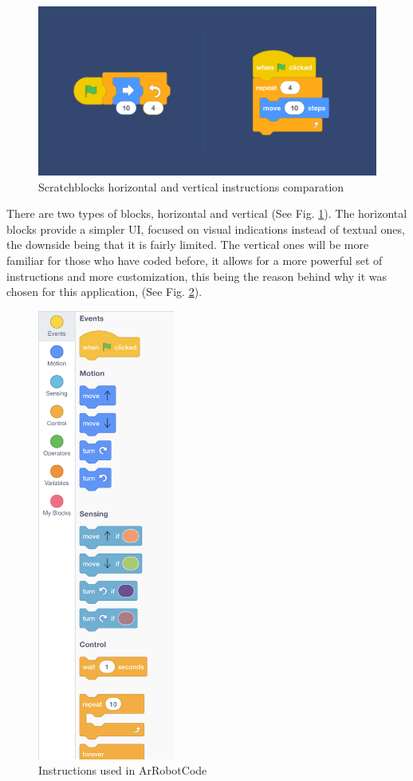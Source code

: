 \documentclass[12 pct]{report}
\begin{document}
\begin{figure}[H]
\includegraphics[width=1.0\textwidth]{scratchblocks}
\centering
\caption{Scratchblocks horizontal and vertical instructions comparation}
\label{fig:scratch-blocks}
\end{figure}

There are two types of blocks, horizontal and vertical (See Fig. \ref{fig:scratch-blocks}). 
The horizontal blocks provide a simpler UI, focused on visual indications instead of textual ones, the downside being that it is fairly limited. 
The vertical ones will be more familiar for those who have coded before, it allows for a more powerful set of instructions and more customization, this being the reason behind why it was chosen for this application, (See Fig. \ref{fig:customInstructions}).

\begin{figure}[H]
\includegraphics[width=0.4\textwidth]{allInstructions}
\centering
\caption{Instructions used in ArRobotCode}
\label{fig:customInstructions}
\end{figure}
\end{document}
